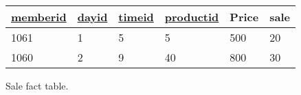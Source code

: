 \begin{figure}[H]
\vspace{0.5cm}

    \begin{tabular}{|l|l|l|l|l|l|}
        \hline
        \underline{memberid}    & \underline{dayid}     & \underline{timeid}  & \underline{productid}  & Price    & sale  \\ \hline
        1061                    & 1                     & 5                   & 5                      & 500      & 20    \\ \hline
        1060                    & 2                     & 9                   & 40                     & 800      & 30    \\ \hline
    \end{tabular}
    \caption{Sale fact table.}
    \label{fig:sale_scheme}
\end{figure}